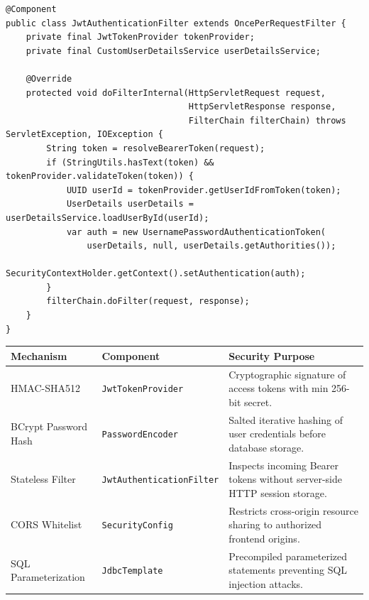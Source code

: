\documentclass[11pt,a4paper,titlepage]{report}
\begin{document}
\begin{lstlisting}[caption={Stateless JWT Authentication Filter Populating SecurityContext}, label={lst:adv_security}]
@Component
public class JwtAuthenticationFilter extends OncePerRequestFilter {
    private final JwtTokenProvider tokenProvider;
    private final CustomUserDetailsService userDetailsService;

    @Override
    protected void doFilterInternal(HttpServletRequest request,
                                    HttpServletResponse response,
                                    FilterChain filterChain) throws ServletException, IOException {
        String token = resolveBearerToken(request);
        if (StringUtils.hasText(token) && tokenProvider.validateToken(token)) {
            UUID userId = tokenProvider.getUserIdFromToken(token);
            UserDetails userDetails = userDetailsService.loadUserById(userId);
            var auth = new UsernamePasswordAuthenticationToken(
                userDetails, null, userDetails.getAuthorities());
            SecurityContextHolder.getContext().setAuthentication(auth);
        }
        filterChain.doFilter(request, response);
    }
}
\end{lstlisting}

\begin{center}
\label{tab:security_mechanisms}
\vspace{3pt}
\begin{tabularx}{\textwidth}{llX}
\toprule
\textbf{Mechanism} & \textbf{Component} & \textbf{Security Purpose} \\
\midrule
HMAC-SHA512 & \texttt{JwtTokenProvider} & Cryptographic signature of access tokens with min 256-bit secret. \\
BCrypt Password Hash & \texttt{PasswordEncoder} & Salted iterative hashing of user credentials before database storage. \\
Stateless Filter & \texttt{JwtAuthenticationFilter} & Inspects incoming Bearer tokens without server-side HTTP session storage. \\
CORS Whitelist & \texttt{SecurityConfig} & Restricts cross-origin resource sharing to authorized frontend origins. \\
SQL Parameterization & \texttt{JdbcTemplate} & Precompiled parameterized statements preventing SQL injection attacks. \\
\bottomrule
\end{tabularx}
\end{center}
\end{document}
